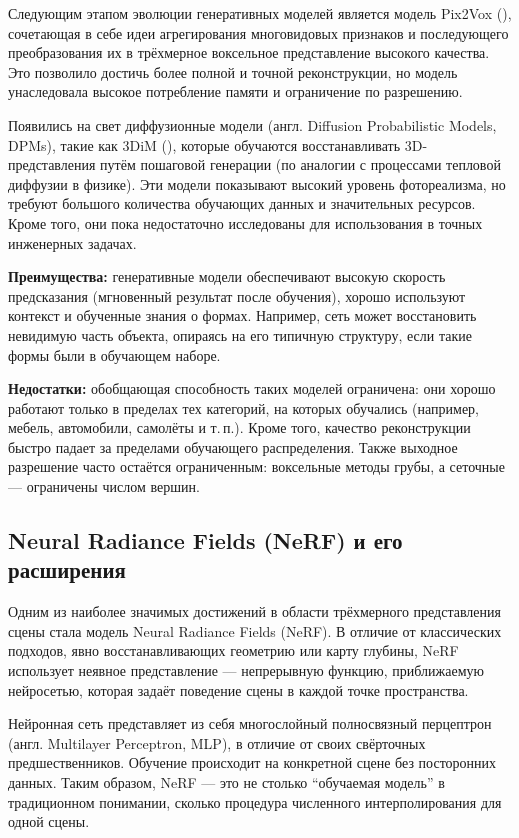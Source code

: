 Следующим этапом эволюции генеративных моделей является модель Pix2Vox
(\cite{Xie_2019}), сочетающая в себе идеи агрегирования многовидовых признаков и
последующего преобразования их в трёхмерное воксельное представление высокого
качества. Это позволило достичь более полной и точной реконструкции, но модель
унаследовала высокое потребление памяти и ограничение по разрешению.

Появились на свет диффузионные модели (англ. Diffusion Probabilistic Models,
DPMs), такие как 3DiM (\cite{watson2022novelviewsynthesisdiffusion}), которые
обучаются восстанавливать 3D-представления путём пошаговой генерации (по
аналогии с процессами тепловой диффузии в физике). Эти модели показывают высокий
уровень фотореализма, но требуют большого количества обучающих данных и
значительных ресурсов. Кроме того, они пока недостаточно исследованы для
использования в точных инженерных задачах.

\textbf{Преимущества:} генеративные модели обеспечивают высокую скорость
предсказания (мгновенный результат после обучения), хорошо используют контекст и
обученные знания о формах. Например, сеть может восстановить невидимую часть
объекта, опираясь на его типичную структуру, если такие формы были в обучающем
наборе.

\textbf{Недостатки:} обобщающая способность таких моделей ограничена: они хорошо
работают только в пределах тех категорий, на которых обучались (например,
мебель, автомобили, самолёты и т.\,п.). Кроме того, качество реконструкции
быстро падает за пределами обучающего распределения.  Также выходное разрешение
часто остаётся ограниченным: воксельные методы грубы, а сеточные — ограничены
числом вершин.

\subsection{Neural Radiance Fields (NeRF) и его расширения}

Одним из наиболее значимых достижений в области трёхмерного представления сцены
стала модель Neural Radiance Fields (NeRF). В отличие от классических подходов,
явно восстанавливающих геометрию или карту глубины, NeRF использует
неявное представление — непрерывную функцию, приближаемую нейросетью, которая
задаёт поведение сцены в каждой точке пространства.

Нейронная сеть представляет из себя многослойный полносвязный перцептрон (англ.
Multilayer Perceptron, MLP), в отличие от своих свёрточных предшественников.
Обучение происходит на конкретной сцене без посторонних данных. Таким образом,
NeRF — это не столько ``обучаемая модель'' в традиционном понимании, сколько
процедура численного интерполирования для одной сцены.

